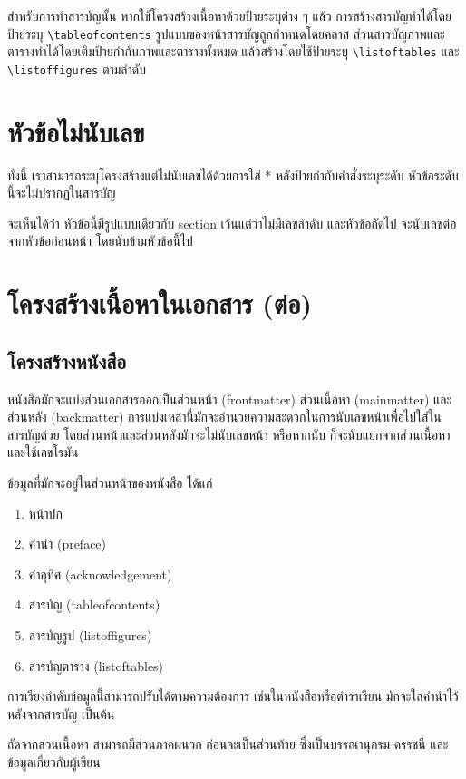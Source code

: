 สำหรับการทำสารบัญนั้น หากใช้โครงสร้างเนื้อหาด้วยป้ายระบุต่าง ๆ แล้ว  การสร้างสารบัญทำได้โดยป้ายระบุ \lstinline|\tableofcontents| รูปแบบของหน้าสารบัญถูกกำหนดโดยคลาส
ส่วนสารบัญภาพและตารางทำได้โดยเติมป้ายกำกับภาพและตารางทั้งหมด แล้วสร้างโดยใช้ป้ายระบุ \lstinline|\listoftables| และ \lstinline|\listoffigures| ตามลำดับ 

\section*{หัวข้อไม่นับเลข}
ทั้งนี้ เราสามารถระบุโครงสร้างแต่ไม่นับเลขได้ด้วยการใส่ * หลังป้ายกำกับคำสั่งระบุระดับ หัวข้อระดับนี้จะไม่ปรากฏในสารบัญ

จะเห็นได้ว่า หัวข้อนี้มีรูปแบบเดียวกับ section เว้นแต่ว่าไม่มีเลขลำดับ และหัวข้อถัดไป จะนับเลขต่อจากหัวข้อก่อนหน้า โดยนับข้ามหัวข้อนี้ไป

\section{โครงสร้างเนื้อหาในเอกสาร (ต่อ)}
\subsection{โครงสร้างหนังสือ}
หนังสือมักจะแบ่งส่วนเอกสารออกเป็นส่วนหน้า (frontmatter) ส่วนเนื้อหา (mainmatter) และส่วนหลัง (backmatter) การแบ่งเหล่านี้มักจะอำนวยความสะดวกในการนับเลขหน้าเพื่อไปใส่ในสารบัญด้วย โดยส่วนหน้าและส่วนหลังมักจะไม่นับเลขหน้า หรือหากนับ ก็จะนับแยกจากส่วนเนื้อหา และใช้เลขโรมัน

ข้อมูลที่มักจะอยู่ในส่วนหน้าของหนังสือ ได้แก่
\begin{enumerate}
	\item หน้าปก
	\item คำนำ (preface)
	\item คำอุทิศ (acknowledgement)
	\item สารบัญ (tableofcontents)
	\item สารบัญรูป (listoffigures)
	\item สารบัญตาราง (listoftables)
\end{enumerate}
การเรียงลำดับข้อมูลนี้สามารถปรับได้ตามความต้องการ เช่นในหนังสือหรือตำราเรียน มักจะใส่คำนำไว้หลังจากสารบัญ เป็นต้น

ถัดจากส่วนเนื้อหา สามารถมีส่วนภาคผนวก ก่อนจะเป็นส่วนท้าย ซึ่งเป็นบรรณานุกรม ดรรชนี และข้อมูลเกี่ยวกับผู้เขียน

